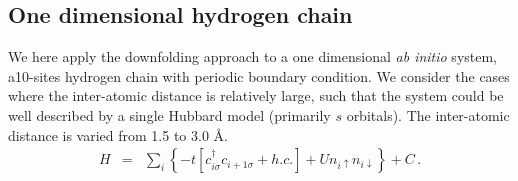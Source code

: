 \subsection{One dimensional hydrogen chain}
We here apply the downfolding approach to a one dimensional \textit{ab initio} system,  a10-sites hydrogen chain with periodic boundary condition.  We consider the cases where the inter-atomic distance is relatively large, such that the system could be well described by a single Hubbard model (primarily $s$ orbitals). The inter-atomic distance is varied from 1.5 to 3.0 \AA. 
\begin{eqnarray}\label{eq:h4model}
H &=& \sum_{i}\left\{-t[c^{\dagger}_{i\sigma}c_{i+1\sigma} +h.c.]+ Un_{i\uparrow}n_{i\downarrow}\right\} + C\,.
\end{eqnarray}

